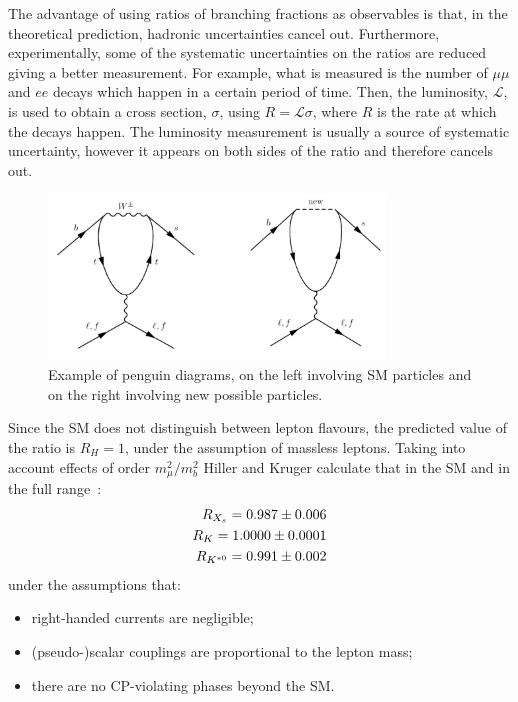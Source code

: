 
The advantage of using ratios of branching fractions as observables is that, in the theoretical prediction, hadronic 
uncertainties cancel out. Furthermore, experimentally, some of the systematic uncertainties on the ratios are reduced
giving a better measurement. For example, what is measured is the number of $\mu\mu$ and $ee$ decays 
which happen in a certain period of time. Then, the luminosity, $\mathcal{L}$, is used to obtain a
cross section, $\sigma$, using $R = \mathcal{L}\sigma$, where $R$ is the rate at which the decays happen. 
The luminosity measurement is usually a source of systematic uncertainty, however it appears on both
sides of the ratio and therefore cancels out.

\begin{figure}[h]
\centering \includegraphics[width=0.8\textwidth]{RKst/figs/penguins.png}
\caption{Example of penguin diagrams, on the left involving SM particles and on the right 
involving new possible particles.}
\label{fig:NPpenguins}
\end{figure}

Since the SM does not distinguish between lepton flavours, the predicted value of the ratio 
is $R_H = 1$, under the assumption of massless leptons. Taking into account effects of order 
$m_\mu^2 / m_b^2$ Hiller and Kruger calculate that in the SM and in the full \qsq range~\cite{Hiller:2003js}:
%
\begin{align}
R_{X_s} = 0.987 \pm 0.006 \\
R_K = 1.0000 \pm 0.0001 \\
R_{{{K}^{*0}}} = 0.991 \pm 0.002 \\
\end{align}
%
\noindent
under the assumptions that:
%
\begin{itemize}
\item right-handed currents are negligible;
\item (pseudo-)scalar couplings are proportional to the lepton mass;
\item there are no CP-violating phases beyond the SM.
\end{itemize}

